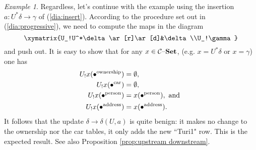 \documentclass{amsart}
\def\tn{\textnormal}
\def\mc{\mathcal}
\def\to{\rightarrow}
\def\taking{\colon}
\def\set{{\text \textendash}{\bf Set}}
\def\mcC{\mc{C}}
\theoremstyle{remark}
\newtheorem{example}[theorem]{Example}
\theoremstyle{definition}
\begin{document}
\begin{example}
Regardless, let's continue with the example using the insertion $a\taking U^*\delta\to\gamma$ of (\ref{dia:insert}).  According to the procedure set out in (\ref{dia:progressive}), we need to compute the maps in the diagram $$\xymatrix{U_!U^*\delta\ar[r]\ar[d]&\delta\\U_!\gamma}$$ and push out.  It is easy to show that for any $x\in\mcC\set$, (e.g. $x=U^*\delta$ or $x=\gamma$) one has \begin{align*}U_!x(\bullet^{\tn{ownership}})&=\emptyset,\\U_!x(\bullet^{\tn{car}})&=\emptyset,\\U_!x(\bullet^{\tn{person}})&=x(\bullet^{\tn{person}}), \tn{ and }\\U_!x(\bullet^{\tn{address}})&=x(\bullet^{\tn{address}}).\end{align*}  It follows that the update $\delta\to\delta(U,a)$ is quite benign: it makes no change to the ownership nor the car tables, it only adds the new ``Turi1" row.  This is the expected result.  See also Proposition \ref{prop:upstream downstream}.  

\end{example}
\end{document}
